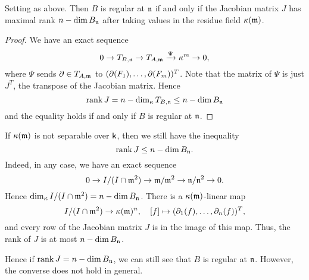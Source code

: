     \begin{theorem}\label{thm: Jacobian criterion}
        Setting as above.
        Then \(B\) is regular at \(\frakn\) if and only if the Jacobian matrix \(J\) has maximal rank \(n - \dim B_\frakn\) after taking values in the residue field \(\rkk(\frakm)\).
    \end{theorem}
    \begin{proof}
        We have an exact sequence
        \[ 0 \to T_{B,\frakn} \to T_{A,\frakm} \xrightarrow{\Psi} \rkk^m \to 0, \]
        where \(\Psi\) sends \(\P \in T_{A,\frakm}\) to \((\P(F_1), \ldots, \P(F_m))^T \).
        Note that the matrix of \(\Psi\) is just \(J^T\), the transpose of the Jacobian matrix.
        Hence 
        \[ \rank J = n - \dim_\rkk T_{B,\frakn} \leq n - \dim B_\frakn \] 
        and the equality holds if and only if \(B\) is regular at \(\frakn\).
    \end{proof}

    \begin{remark}\label{rmk: rank of Jacobian matrix for inseparable extensions}
        If \(\rkk(\frakm)\) is not separable over \(\kk\), then we still have the inequality
        \[ \rank J \leq n - \dim B_\frakn. \]
        Indeed, in any case, we have an exact sequence
        \[ 0 \to I/(I\cap \frakm^2) \to \frakm/\frakm^2 \to \frakn/\frakn^2 \to 0. \]
        Hence \(\dim_\rkk I/(I\cap \frakm^2) = n - \dim B_\frakn\).
        There is a \(\rkk(\frakm)\)-linear map
        \[ I/(I\cap \frakm^2) \to \rkk(\frakm)^n, \quad [f] \mapsto (\P_1(f), \ldots, \P_n(f))^T, \]
        and every row of the Jacobian matrix \(J\) is in the image of this map.
        Thus, the rank of \(J\) is at most \(n - \dim B_\frakn\).

        Hence if \(\rank J = n - \dim B_\frakn\), we can still see that \(B\) is regular at \(\frakn\).
        However, the converse does not hold in general.
    \end{remark}

